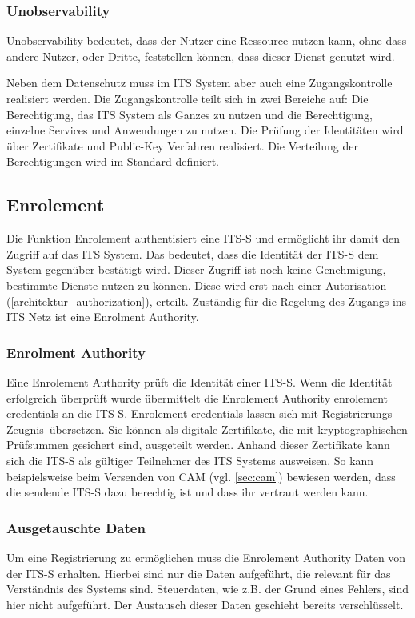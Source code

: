 \subsubsection{Unobservability}
Unobservability bedeutet, dass der Nutzer eine Ressource nutzen kann, ohne dass andere Nutzer, oder Dritte, feststellen können, dass dieser Dienst genutzt wird.



Neben dem Datenschutz muss im \ac{ITS} System aber auch eine Zugangskontrolle realisiert werden. Die Zugangskontrolle teilt sich in zwei Bereiche auf: Die Berechtigung, das \ac{ITS} System als Ganzes zu nutzen und die Berechtigung, einzelne Services und Anwendungen zu nutzen. Die Prüfung der Identitäten wird über Zertifikate und Public-Key Verfahren realisiert. Die Verteilung der Berechtigungen wird im Standard \cite{ts102731} definiert.

\subsection{Enrolement \label{architektur_enrolement}}
Die Funktion Enrolement authentisiert eine \ac{ITS-S} und ermöglicht ihr damit den Zugriff auf das  \ac{ITS} System.  Das bedeutet, dass die Identität der \ac{ITS-S} dem System gegenüber bestätigt wird. Dieser Zugriff ist noch keine Genehmigung, bestimmte Dienste nutzen zu können. Diese wird erst nach einer Autorisation (\autoref{architektur_authorization}), erteilt. Zuständig für die Regelung des Zugangs ins \ac{ITS} Netz ist eine Enrolment Authority.

\subsubsection{Enrolment Authority}
Eine Enrolement Authority prüft die Identität einer \ac{ITS-S}. Wenn die Identität erfolgreich überprüft wurde  übermittelt die Enrolement Authority enrolement credentials an die \ac{ITS-S}. Enrolement credentials lassen sich mit \glqq Registrierungs Zeugnis\grqq~übersetzen. Sie können als digitale Zertifikate, die  mit kryptographischen Prüfsummen gesichert sind, ausgeteilt werden. Anhand dieser Zertifikate kann sich die \ac{ITS-S} als gültiger Teilnehmer des \ac{ITS} Systems ausweisen. So kann beispielsweise beim Versenden von \ac{CAM} (vgl. \autoref{sec:cam}) bewiesen werden, dass die sendende \ac{ITS-S} dazu berechtig ist und dass ihr vertraut werden kann. 

\subsubsection{Ausgetauschte Daten}
Um eine Registrierung zu ermöglichen muss die Enrolement Authority Daten von der \ac{ITS-S} erhalten. Hierbei sind nur die Daten aufgeführt, die relevant für das Verständnis des Systems sind. Steuerdaten, wie z.B. der Grund eines Fehlers, sind hier nicht aufgeführt. Der Austausch dieser Daten geschieht bereits verschlüsselt. 

